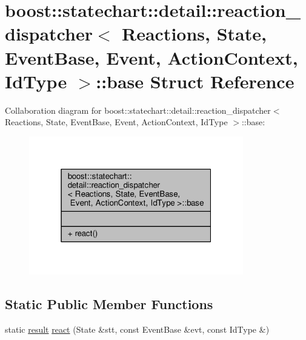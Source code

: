 \hypertarget{structboost_1_1statechart_1_1detail_1_1reaction__dispatcher_1_1base}{}\section{boost\+:\+:statechart\+:\+:detail\+:\+:reaction\+\_\+dispatcher$<$ Reactions, State, Event\+Base, Event, Action\+Context, Id\+Type $>$\+:\+:base Struct Reference}
\label{structboost_1_1statechart_1_1detail_1_1reaction__dispatcher_1_1base}


Collaboration diagram for boost\+:\+:statechart\+:\+:detail\+:\+:reaction\+\_\+dispatcher$<$ Reactions, State, Event\+Base, Event, Action\+Context, Id\+Type $>$\+:\+:base\+:
\nopagebreak
\begin{figure}[H]
\begin{center}
\leavevmode
\includegraphics[width=265pt]{structboost_1_1statechart_1_1detail_1_1reaction__dispatcher_1_1base__coll__graph}
\end{center}
\end{figure}
\subsection*{Static Public Member Functions}
\begin{DoxyCompactItemize}
\item 
static \mbox{\hyperlink{namespaceboost_1_1statechart_abe807f6598b614d6d87bb951ecd92331}{result}} \mbox{\hyperlink{structboost_1_1statechart_1_1detail_1_1reaction__dispatcher_1_1base_acc2a12ce404e84665adf2b53ad6be6c0}{react}} (State \&stt, const Event\+Base \&evt, const Id\+Type \&)
\end{DoxyCompactItemize}


